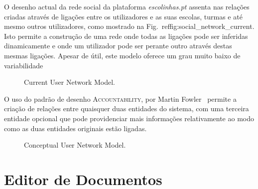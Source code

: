 \documentclass[9pt,a4paper]{extarticle}
\begin{document}
\begin{multicols}{2}
O desenho actual da rede social da plataforma \emph{escolinhas.pt} assenta nas relações criadas através de ligações entre os utilizadores e as suas escolas, turmas e até mesmo outros utilizadores, como mostrado na Fig.~ref{fig:social_network_current}. Isto permite a construção de uma rede onde todas as ligações pode ser inferidas dinamicamente e onde um utilizador pode ser perante outro através destas mesmas ligações. Apesar de útil, este modelo oferece um grau muito baixo de variabilidade

\begin{figure}[H]
  \caption{Current User Network Model.}
  \label{fig:social_network_current}
\end{figure}


O uso do padrão de desenho \textsc{Accountability}, por Martin Fowler~\cite{fowler_accountability} permite a criação de relações entre quaisquer duas entidades do sistema, com uma terceira entidade opcional que pode providenciar mais informações relativamente ao modo como as duas entidades originais estão ligadas.

\begin{figure}[H]
  \caption{Conceptual User Network Model.}
  \label{fig:social_network_conceptual}
\end{figure}

\section{Editor de Documentos}\label{sec:document_editor}


\end{multicols}
\end{document}
